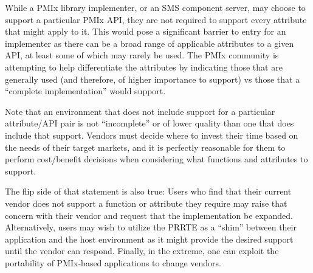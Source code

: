 {%

While a \ac{PMIx} library implementer, or an \ac{SMS} component server, may choose to support a particular \ac{PMIx} \ac{API}, they are not required to support every attribute that might apply to it. This would pose a significant barrier to entry for an implementer as there can be a broad range of applicable attributes to a given \ac{API}, at least some of which may rarely be used. The \ac{PMIx} community is attempting to help differentiate the attributes by indicating those that are generally used (and therefore, of higher importance to support) vs those that a ``complete implementation'' would support.

Note that an environment that does not include support for a particular attribute/\ac{API} pair is not ``incomplete'' or of lower quality than one that does include that support. Vendors must decide where to invest their time based on the needs of their target markets, and it is perfectly reasonable for them to perform cost/benefit decisions when considering what functions and attributes to support.

The flip side of that statement is also true: Users who find that their current vendor does not support a function or attribute they require may raise that concern with their vendor and request that the implementation be expanded. Alternatively, users may wish to utilize the \ac{PRRTE} as a ``shim'' between their application and the host environment as it might provide the desired support until the vendor can respond. Finally, in the extreme, one can exploit the portability of PMIx-based applications to change vendors.

\subsection{}


}
